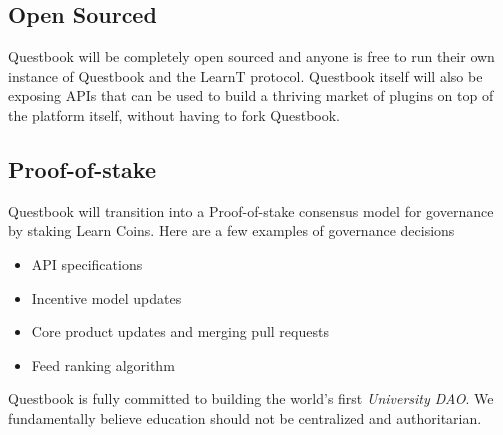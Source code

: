 \documentclass{article}
\begin{document}
    \subsection{Open Sourced}
      Questbook will be completely open sourced and anyone is free to run their own instance of Questbook and the LearnT protocol.
      Questbook itself will also be exposing APIs that can be used to build a thriving market of plugins on top of the platform itself, without having to fork Questbook.

    \subsection{Proof-of-stake}
      Questbook will transition into a Proof-of-stake consensus model for governance by staking Learn Coins.
      Here are a few examples of governance decisions 
      \begin{itemize}
        \item API specifications
        \item Incentive model updates
        \item Core product updates and merging pull requests
        \item Feed ranking algorithm 
      \end{itemize}

    Questbook is fully committed to building the world's first \textit{University DAO}.
    We fundamentally believe education should not be centralized and authoritarian.
\end{document}

